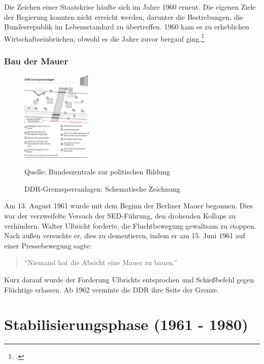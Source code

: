 \documentclass[12pt,a4paper]{article}
\begin{document}
Die Zeichen einer Staatskrise häufte sich im Jahre 1960 erneut. Die eigenen Ziele der Regierung konnten nicht erreicht werden, darunter die Bestrebungen, die Bundesrepublik im Lebensstandard zu übertreffen.
1960 kam es zu erheblichen Wirtschaftseinbrüchen, obwohl es die Jahre zuvor bergauf ging.\footcite{izpb:ausbau-system}

\subsubsection{Bau der Mauer}
\label{bau-der-mauer}

\begin{figure}[h]
    \centering
    \includegraphics[width=0.3\textwidth]{Bilder/Grenze-Schema.jpg}
    \caption{DDR-Grenzsperranlagen: Schematische Zeichnung}
    Quelle: Bundeszentrale zur politischen Bildung
    \label{img:grenze-schema}
\end{figure}

Am 13. August 1961 wurde mit dem Beginn der Berliner Mauer begonnen. Dies war der verzweifelte Versuch der SED-Führung, den drohenden Kollaps zu verhindern. Walter Ulbricht forderte, die Fluchtbewegung gewaltsam zu stoppen.
Nach außen versuchte er, dies zu dementieren, indem er am 15. Juni 1961 auf einer Pressebewegung sagte:

\begin{quotation}
    \enquote{Niemand hat die Absicht eine Mauer zu bauen.}
\end{quotation}

Kurz darauf wurde der Forderung Ulbrichts entsprochen und Schießbefehl gegen Flüchtige erlassen. Ab 1962 verminte die DDR ihre Seite der Grenze.



\newpage



\section{Stabilisierungsphase (1961 - 1980)}
\label{sec:stabilisierungsphase}
\end{document}
